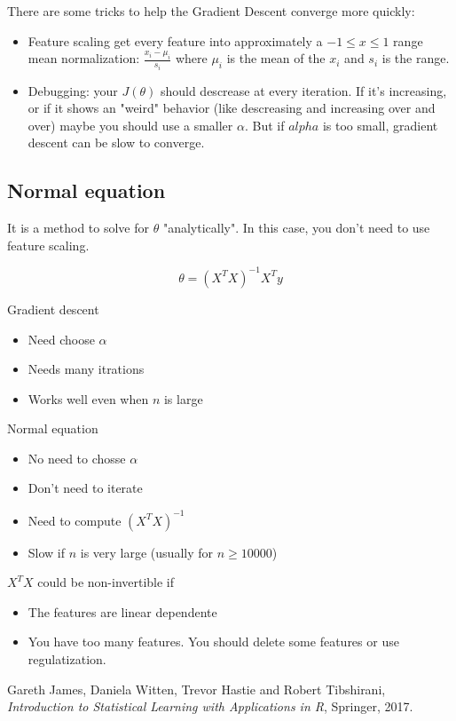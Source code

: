 \documentclass[a4paper,11pt]{article}
\begin{document}
There are some tricks to help the Gradient Descent converge more quickly:
\begin{itemize}
  \item Feature scaling
    \subitem get every feature into approximately a $-1 \leq x \leq 1$ range
    \subitem mean normalization: $\frac{x_i-\mu_i}{s_i}$ where $\mu_i$ is the mean of the $x_i$ and $s_i$ is the range.
  \item Debugging: your $J(\theta)$ should descrease at every iteration. If it's increasing, or if it shows an "weird" behavior (like descreasing and increasing over and over) maybe you should use a smaller $\alpha$. But if $alpha$ is too small, gradient descent can be slow to converge.
\end{itemize}

\subsection*{Normal equation}
It is a method to solve for $\theta$ "analytically". In this case, you don't need to use feature scaling.

\begin{equation}
  \theta=(X^T X)^{-1}X^T y
\end{equation}

Gradient descent
\begin{itemize}
  \item Need choose $\alpha$
  \item Needs many itrations
  \item Works well even when $n$ is large
\end{itemize}

Normal equation
\begin{itemize}
  \item No need to chosse $\alpha$
  \item Don't need to iterate
  \item Need to compute $(X^TX)^{-1}$
  \item Slow if $n$ is very large (usually for $n\geq 10000$)
\end{itemize}

$X^TX$ could be non-invertible if
\begin{itemize}
  \item The features are linear dependente
  \item You have too many features. You should delete some features or use regulatization.
\end{itemize}

\clearpage
\begin{thebibliography}{99}
  Gareth James, Daniela Witten, Trevor Hastie and Robert Tibshirani,
  \textit{Introduction to Statistical Learning with Applications in R},
  Springer,
  2017.

\end{thebibliography}
\end{document}
